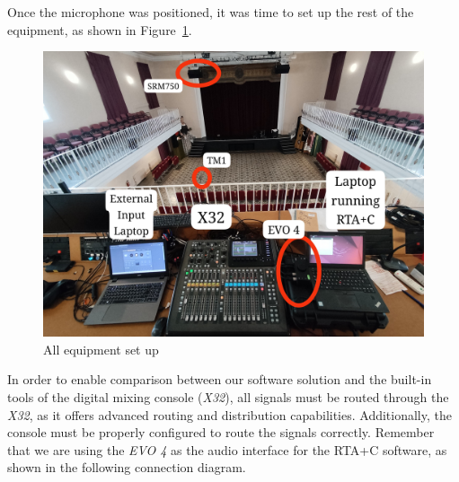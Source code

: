 Once the microphone was positioned, it was time to set up the rest of the equipment, as shown in Figure~\ref{fig:Coro_setup}.

\begin{figure}[H]
	\centering
	\includegraphics[width=1
	\linewidth]{Figures/Coro_setup.jpeg}
	\caption{All equipment set up}
	\label{fig:Coro_setup}
\end{figure}

In order to enable comparison between our software solution and the built-in tools of the digital mixing console (\textit{X32}), all signals must be routed through the \textit{X32}, as it offers advanced routing and distribution capabilities. Additionally, the console must be properly configured to route the signals correctly. Remember that we are using the \textit{EVO 4} as the audio interface for the RTA+C software, as shown in the following connection diagram.

